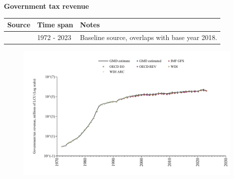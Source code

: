 \documentclass[12pt,a4paper,landscape]{article}
\begin{document}
\begin{adjustbox}{max totalsize={\paperwidth}{\paperheight},center}
\begin{minipage}[t][\textheight][t]{\textwidth}
\vspace*{0.5cm}
{}
\begin{center}
{\Large\bfseries Government tax revenue}
\end{center}
\vspace{0.5cm}
\begin{table}[H]
\centering
\small
\begin{tabular}{|l|l|l|}
\hline
\textbf{Source} & \textbf{Time span} & \textbf{Notes} \\
\hline
\rowcolor{white}\cite{GMD_estimated}& 1972 - 2023 &Baseline source, overlaps with base year 2018. \\
\hline
\end{tabular}
\end{table}
\begin{figure}[H]
\centering
\includegraphics[width=\textwidth,height=0.6\textheight,keepaspectratio]{graphs/ISR_govtax.pdf}
\end{figure}
\end{minipage}
\end{adjustbox}
\end{document}
